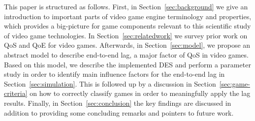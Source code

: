 This paper is structured as follows.
First, in Section~\ref{sec:background} we give an introduction to important parts of video game engine terminology and properties, which provides a big-picture for game components relevant to this scientific study of video game technologies.
In Section~\ref{sec:relatedwork} we survey prior work on \gls{QoS} and \acrfull{QoE} for video games.
Afterwards, in Section~\ref{sec:model}, we propose an abstract model to describe end-to-end lag, a major factor of \gls{QoS} in video games. Based on this model, we describe the implemented \gls{DES} and perform a parameter study in order to identify main influence factors for the end-to-end lag in Section~\ref{sec:simulation}. This is followed up by a discussion in Section~\ref{sec:game-criteria} on how to correctly classify games in order to meaningfully apply the lag results. Finally, in Section~\ref{sec:conclusion} the key findings are discussed in addition to providing some concluding remarks and pointers to future work.













